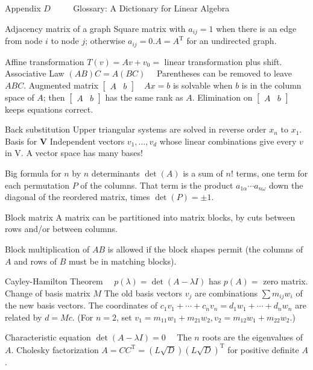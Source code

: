 Appendix
$D$
$\qquad$
Glossary: A Dictionary for Linear Algebra

Adjacency matrix of a graph Square matrix with $a_{i j}=1$ when there is an edge from node $i$ to node $j$; otherwise $a_{i j}=0 . A=A^{\mathrm{T}}$ for an undirected graph.

Affine transformation $T(v)=A v+v_0=$ linear transformation plus shift.
Associative Law $(A B) C=A(B C) \quad$ Parentheses can be removed to leave $A B C$.
Augmented matrix $\left[\begin{array}{ll}A & b\end{array}\right] \quad A x=b$ is solvable when $b$ is in the column space of $A$; then $\left[\begin{array}{ll}A & b\end{array}\right]$ has the same rank as $A$. Elimination on $\left[\begin{array}{ll}A & b\end{array}\right]$ keeps equations correct.

Back substitution Upper triangular systems are solved in reverse order $x_n$ to $x_1$.
Basis for $\mathbf{V}$ Independent vectors $v_1, \ldots, v_d$ whose linear combinations give every $v$ in V. A vector space has many bases!

Big formula for $n$ by $n$ determinants $\operatorname{det}(A)$ is a sum of $n!$ terms, one term for each permutation $P$ of the columns. That term is the product $a_{1 \alpha} \cdots a_{n \omega}$ down the diagonal of the reordered matrix, times $\operatorname{det}(P)= \pm 1$.

Block matrix A matrix can be partitioned into matrix blocks, by cuts between rows and/or between columns.

Block multiplication of $A B$ is allowed if the block shapes permit (the columns of $A$ and rows of $B$ must be in matching blocks).

Cayley-Hamilton Theorem $\quad p(\lambda)=\operatorname{det}(A-\lambda I)$ has $p(A)=$ zero matrix.
Change of basis matrix $M$ The old basis vectors $v_j$ are combinations $\sum m_{i j} w_i$ of the new basis vectors. The coordinates of $c_1 v_1+\cdots+c_n v_n=d_1 w_1+\cdots+d_n w_n$ are related by $d=M c$. (For $n=2$, set $v_1=m_{11} w_1+m_{21} w_2, v_2=m_{12} w_1+m_{22} w_2$.)

Characteristic equation $\operatorname{det}(A-\lambda I)=0 \quad$ The $n$ roots are the eigenvalues of $A$.
Cholesky factorization $A=C C^{\mathrm{T}}=(L \sqrt{D})(L \sqrt{D})^{\mathrm{T}}$ for positive definite $A$.
